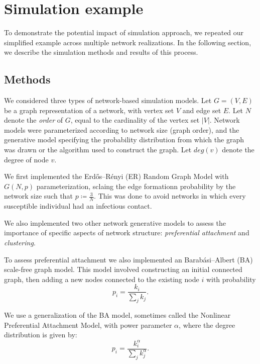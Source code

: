 \documentclass{article}
\theoremstyle{definition}
\begin{document}
\section{Simulation example}
To demonstrate the potential impact of simulation approach, we repeated our simplified example across multiple network realizations. In the following section, we describe the simulation methods and results of this process.

\subsection{Methods}
We considered three types of network-based simulation models. Let $G=(V,E)$ be a graph representation of a network, with vertex set $V$ and edge set $E$. Let $N$ denote the \textit{order} of $G$, equal to the cardinality of the vertex set $\vert V \vert$. Network models were parameterized according to network size (graph order), and the generative model specifying the probability distribution from which the graph was drawn or the algorithm used to construct the graph. Let $deg(v)$ denote the degree of node $v$.

We first implemented the  Erdős–Rényi (ER) Random Graph Model with $G(N,p)$ parameterization, sclaing the edge formationn probability by the network size such that $p \coloneqq \frac{3}{N}$. This was done to avoid networks in which every susceptible individual had an infectious contact. 

We also implemented two other network generative models to assess the importance of specific aspects of network structure: \textit{preferential attachment} and \textit{clustering}. 

To assess preferential attachment we also implemented an Barabási–Albert (BA) scale-free graph model. This model involved constructing an initial connected graph, then adding a new nodes connected to the existing node $i$ with probability 
\begin{equation*}
    p_{i}=\frac{k_{i}}{\sum_{j}k_{j}}.
\end{equation*}

We use a generalization of the BA model, sometimes called the Nonlinear Preferential Attachment Model, with power parameter $\alpha$, where the degree distribution is given by:
\begin{equation*}
    p_{i}=\frac{k_{i}^{\alpha}}{\sum_{j}k_{j}^{\alpha}}.
\end{equation*}
\end{document}
